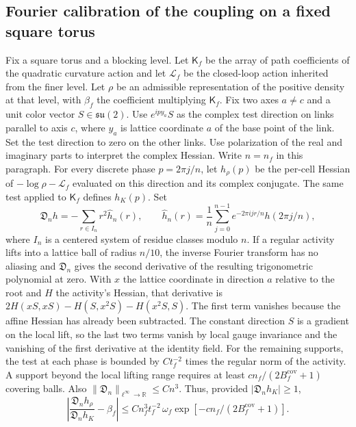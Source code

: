 \documentclass[11pt,a4paper]{article}
\numberwithin{equation}{section}
\begin{document}
\subsection{Fourier calibration of the coupling on a fixed square torus}
\label{lem:geometry-shoot}

Fix a square torus and a blocking level. Let \(\mathsf K_f\) be the array of path coefficients of the quadratic curvature action and let \(\mathcal L_f\) be the closed-loop action inherited from the finer level. Let \(\rho\) be an admissible representation of the positive density at that level, with \(\beta_f\) the coefficient multiplying \(\mathsf K_f\). Fix two axes \(a\ne c\) and a unit color vector \(S\in\mathfrak{su}(2)\). Use \(e^{ipy_a}S\) as the complex test direction on links parallel to axis \(c\), where \(y_a\) is lattice coordinate \(a\) of the base point of the link. Set the test direction to zero on the other links. Use polarization of the real and imaginary parts to interpret the complex Hessian. Write \(n=n_f\) in this paragraph. For every discrete phase \(p=2\pi j/n\), let \(h_\rho(p)\) be the per-cell Hessian of \(-\log\rho-\mathcal L_f\) evaluated on this direction and its complex conjugate. The same test applied to \(\mathsf K_f\) defines \(h_K(p)\). Set
\[
 \mathfrak D_n h=-\sum_{r\in I_n}r^2\widehat h_n(r),\qquad
 \widehat h_n(r)=\frac1n\sum_{j=0}^{n-1}
                    e^{-2\pi i jr/n}h(2\pi j/n),
\]
where \(I_n\) is a centered system of residue classes modulo \(n\). If a regular activity lifts into a lattice ball of radius \(n/10\), the inverse Fourier transform has no aliasing and \(\mathfrak D_n\) gives the second derivative of the resulting trigonometric polynomial at zero. With \(x\) the lattice coordinate in direction \(a\) relative to the root and \(H\) the activity's Hessian, that derivative is \(2H(xS,xS)-H(S,x^2S)-H(x^2S,S)\). The first term vanishes because the affine Hessian has already been subtracted. The constant direction \(S\) is a gradient on the local lift, so the last two terms vanish by local gauge invariance and the vanishing of the first derivative at the identity field. For the remaining supports, the test at each phase is bounded by \(Ct_f^{-2}\) times the regular norm of the activity. A support beyond the local lifting range requires at least \(cn_f/(2B_f^{\mathrm{cov}}+1)\) covering balls. Also \(\|\mathfrak D_n\|_{\ell^\infty\to\mathbb R}\le Cn^3\). Thus, provided \(|\mathfrak D_n h_K|\ge1\),
\begin{equation}
 \left|\frac{\mathfrak D_n h_\rho}{\mathfrak D_n h_K}-\beta_f\right|
 \le Cn_f^3 t_f^{-2}\,\omega_f\exp[-c n_f/(2B_f^{\mathrm{cov}}+1)] .
 \label{eq:geom-beta-readout}
\end{equation}
\end{document}
